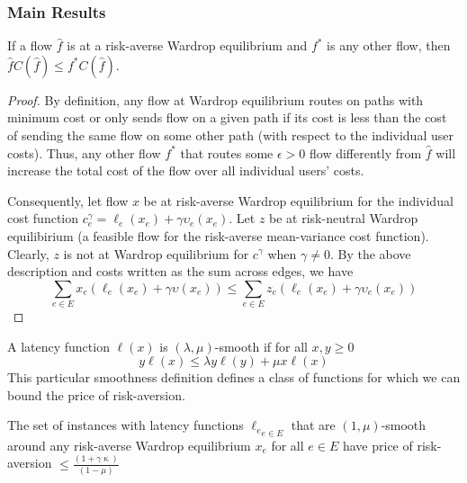 \subsubsection{Main Results}
\begin{theorem}
    If a flow $\hat{f}$ is at a risk-averse Wardrop equilibrium and $f^*$ is any other flow, then $\hat{f}C(\hat{f})\leq f^*C(\hat{f})$. 
    \label{variational}
\end{theorem}

\begin{proof}
    By definition, any flow at Wardrop equilibrium routes on paths with minimum cost or only sends flow on a given path if its cost is less than
    the cost of sending the same flow on some other path (with respect to the individual user costs). 
    Thus, any other flow $f^*$ that routes some $\epsilon > 0$ flow differently from $\hat{f}$ will increase the total cost of the flow over all individual users' costs.

    Consequently, let flow $x$ be at risk-averse Wardrop equilibrium for the individual cost function $c^\gamma_e = \ell_e(x_e) +\gamma \upsilon_e(x_e)$. Let $z$ be at risk-neutral Wardrop equilibirium (a feasible flow for the risk-averse mean-variance cost function). 
    Clearly, $z$ is not at Wardrop equilibrium for $c^\gamma$ when $\gamma \neq 0$. 
    By the above description and costs written as the sum across edges, we have
    $$\sum_{e \in E}x_e(\ell_e(x_e) + \gamma \upsilon(x_e)) \leq \sum_{e \in E} z_e(\ell_e(x_e) + \gamma \upsilon_e(x_e))$$
\end{proof}

\begin{definition}
    A latency function $\ell(x)$ is $(\lambda, \mu)$-smooth if for all $x, y \geq 0$ $$ y\ell(x) \leq \lambda y\ell(y) + \mu x \ell(x)$$
    This particular smoothness definition defines a class of functions for which we can bound the price of risk-aversion.
\end{definition}

\begin{theorem}
    The set of instances with latency functions ${\ell_e}_{e \in E}$ that are $(1,\mu)$-smooth around any risk-averse Wardrop equilibrium $x_e$ for all $e \in E$ have price of risk-aversion
    $\leq \displaystyle \frac{(1 + \gamma \upkappa)}{(1 - \mu)}$
\end{theorem}

